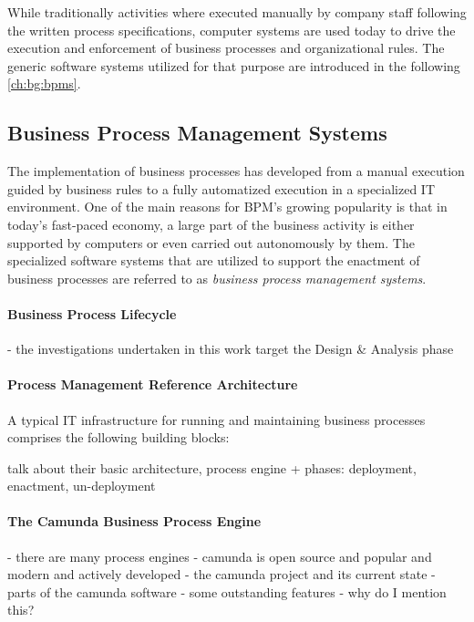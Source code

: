 While traditionally activities where executed manually by company staff following the written process specifications, computer systems are used today to drive the execution and enforcement of business processes and organizational rules.
The generic software systems utilized for that purpose are introduced in the following \autoref{ch:bg:bpms}.


\subsection{Business Process Management Systems}\label{ch:bg:bpms}
The implementation of business processes has developed from a manual execution guided by business rules to a fully automatized execution in a specialized IT environment.
One of the main reasons for \acs{BPM}'s growing popularity is that in today's fast-paced economy, a large part of the business activity is either supported by computers or even carried out autonomously by them.
The specialized software systems that are utilized to support the enactment of business processes are referred to as \emph{business process management systems}.

\paragraph{Business Process Lifecycle}

- the investigations undertaken in this work target the Design \& Analysis phase

\paragraph{Process Management Reference Architecture}
A typical IT infrastructure for running and maintaining business processes comprises the following building blocks:




talk about their basic architecture, process engine
+ phases: deployment, enactment, un-deployment

\paragraph{The Camunda Business Process Engine}\label{ch:bg:camunda}
- there are many process engines
- camunda is open source and popular and modern and actively developed
- the camunda project and its current state
- parts of the camunda software
- some outstanding features
- why do I mention this?


